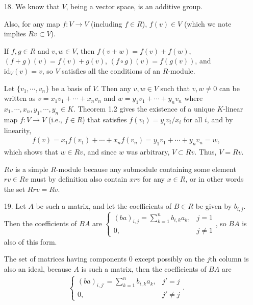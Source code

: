 \documentclass[12pt]{article}
\begin{document}
\begin{enumerate}
    \item[18.]
        We know that $V$, being a vector space, is an additive group. \par
        Also, for any map $f : V \to V$ (including $f \in R$), $f(v) \in V$ (which we note implies $Rv \subset V$). \par
        If $f, g \in R$ and $v, w \in V$, then $f(v + w) = f(v) + f(w)$, $(f + g)(v) = f(v) + g(v)$, $(f \circ g)(v) = f(g(v))$, and $\text{id}_V(v) = v$, so $V$ satisfies all the conditions of an $R$-module. \par
        Let $\{ v_1, \cdots, v_n \}$ be a basis of $V$. Then any $v, w \in V$ such that $v, w \neq 0$ can be written as $v = x_1 v_1 + \cdots + x_n v_n$ and $w = y_1 v_1 + \cdots + y_n v_n$ where $x_1, \cdots, x_n, y_1, \cdots, y_n \in K$. Theorem 1.2 gives the existence of a unique $K$-linear map $f : V \to V$ (i.e., $f \in R$) that satisfies $f(v_i) = y_i v_i / x_i$ for all $i$, and by linearity,
        \begin{align*}
            f(v) = x_1 f(v_1) + \cdots + x_n f(v_n) = y_1 v_1 + \cdots + y_n v_n = w,
        \end{align*}
        which shows that $w \in Rv$, and since $w$ was arbitrary, $V \subset Rv$. Thus, $V = Rv$. \par
        $Rv$ is a simple $R$-module because any submodule containing some element $rv \in Rv$ must by definition also contain $xrv$ for any $x \in R$, or in other words the set $Rrv = Rv$.

    \item[19.]
        Let $A$ be such a matrix, and let the coefficients of $B \in R$ be given by $b_{i, j}$. Then the coefficients of $BA$ are
        $\begin{cases}
            (ba)_{i, j} = \sum_{k = 1}^n b_{i, k} a_k, &j = 1 \\
            0, &j \neq 1
        \end{cases}$, so $BA$ is also of this form. \par
        The set of matrices having components 0 except possibly on the $j$th column is also an ideal, because $A$ is such a matrix, then the coefficients of $BA$ are
        \begin{align*}
            \begin{cases}
                (ba)_{i, j'} = \sum_{k = 1}^n b_{i, k} a_k, &j' = j \\
                0, &j' \neq j
            \end{cases}.
        \end{align*}


\end{enumerate}
\end{document}
